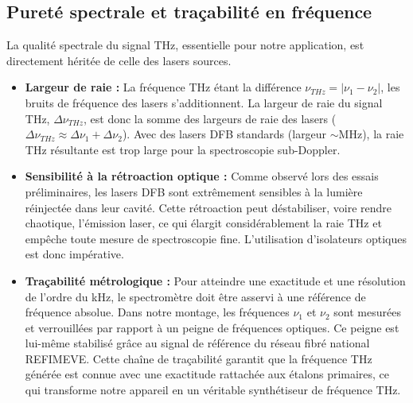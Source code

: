 




\subsection{Pureté spectrale et traçabilité en fréquence}

La qualité spectrale du signal THz, essentielle pour notre application, est directement héritée de celle des lasers sources.
\begin{itemize}
    \item \textbf{Largeur de raie :} La fréquence THz étant la différence $\nu_{THz} = |\nu_1 - \nu_2|$, les bruits de fréquence des lasers s'additionnent. La largeur de raie du signal THz, $\Delta\nu_{THz}$, est donc la somme des largeurs de raie des lasers ($\Delta\nu_{THz} \approx \Delta\nu_1 + \Delta\nu_2$). Avec des lasers DFB standards (largeur $\sim$MHz), la raie THz résultante est trop large pour la spectroscopie sub-Doppler.

    \item \textbf{Sensibilité à la rétroaction optique :} Comme observé lors des essais préliminaires, les lasers DFB sont extrêmement sensibles à la lumière réinjectée dans leur cavité. Cette rétroaction peut déstabiliser, voire rendre chaotique, l'émission laser, ce qui élargit considérablement la raie THz et empêche toute mesure de spectroscopie fine. L'utilisation d'isolateurs optiques est donc impérative.

    \item \textbf{Traçabilité métrologique :} Pour atteindre une exactitude et une résolution de l'ordre du kHz, le spectromètre doit être asservi à une référence de fréquence absolue. Dans notre montage, les fréquences $\nu_1$ et $\nu_2$ sont mesurées et verrouillées par rapport à un peigne de fréquences optiques. Ce peigne est lui-même stabilisé grâce au signal de référence du réseau fibré national REFIMEVE. Cette chaîne de traçabilité garantit que la fréquence THz générée est connue avec une exactitude rattachée aux étalons primaires, ce qui transforme notre appareil en un véritable synthétiseur de fréquence THz.
\end{itemize}





